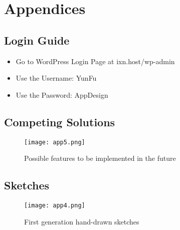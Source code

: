 \documentclass[fontsize=11pt]{extarticle}
\numberwithin{figure}{section} %
\numberwithin{table}{section}%
\begin{document}
% 

\printbibliography


\newpage
\section{Appendices}

\subsection{Login Guide}
\begin{itemize}

  \item Go to WordPress Login Page at ixn.host/wp-admin
  \item Use the Username: YunFu
  \item Use the Password: AppDesign

\end{itemize}

\begin{landscape}
\subsection{Competing Solutions}
  \begin{figure}[H]
      \centering
      \texttt{[image: app5.png]}
      \caption{Possible features to be implemented in the future}
 \end{figure}
 \end{landscape}

 \newpage


\begin{landscape}
\subsection{Sketches}
 \begin{figure}[H]
      \centering
      \texttt{[image: app4.png]}
      \caption{First generation hand-drawn sketches}
 \end{figure}
\end{landscape}
\end{document}
